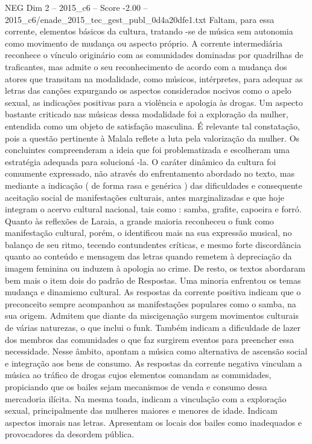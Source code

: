 \begin{textsample}{NEG Dim 2 – 2015\_c6 – Score -2.00 – 2015\_c6/enade\_2015\_tec\_gest\_publ\_0d4a20dfe1.txt}
Faltam, para essa corrente, elementos básicos da cultura, tratando -se de música sem autonomia como movimento de mudança ou aspecto próprio.
A corrente intermediária reconhece o vínculo originário com as comunidades dominadas por quadrilhas de traficantes, mas admite o seu reconhecimento de acordo com a mudança dos atores que transitam na modalidade, como músicos, intérpretes, para adequar as letras das canções expurgando os aspectos considerados nocivos como o apelo sexual, as indicações positivas para a violência e apologia às drogas.
Um aspecto bastante criticado nas músicas dessa modalidade foi a exploração da mulher, entendida como um objeto de satisfação masculina.
É relevante tal constatação, pois a questão pertinente à Malala reflete a luta pela valorização da mulher.
Os concluintes compreenderam a ideia que foi problematizada e escolheram uma estratégia adequada para solucioná -la.
O caráter dinâmico da cultura foi comumente expressado, não através do enfrentamento abordado no texto, mas mediante a indicação ( de forma rasa e genérica ) das dificuldades e consequente aceitação social de manifestações culturais, antes marginalizadas e que hoje integram o acervo cultural nacional, tais como : samba, grafite, capoeira e forró.
Quanto às reflexões de Laraia, a grande maioria reconheceu o funk como manifestação cultural, porém, o identificou mais na sua expressão musical, no balanço de seu ritmo, tecendo contundentes críticas, e mesmo forte discordância quanto ao conteúdo e mensagem das letras quando remetem à depreciação da imagem feminina ou induzem à apologia ao crime.
De resto, os textos abordaram bem mais o item dois do padrão de Respostas.
Uma minoria enfrentou os temas mudança e dinamismo cultural.
As respostas da corrente positiva indicam que o preconceito sempre acompanhou as manifestações populares como o samba, na sua origem.
Admitem que diante da miscigenação surgem movimentos culturais de várias naturezas, o que inclui o funk.
Também indicam a dificuldade de lazer dos membros das comunidades o que faz surgirem eventos para preencher essa necessidade.
Nesse âmbito, apontam a música como alternativa de ascensão social e integração aos bens de consumo.
As respostas da corrente negativa vinculam a música ao tráfico de drogas cujos elementos comandam as comunidades, propiciando que os bailes sejam mecanismos de venda e consumo dessa mercadoria ilícita.
Na mesma toada, indicam a vinculação com a exploração sexual, principalmente das mulheres maiores e menores de idade.
Indicam aspectos imorais nas letras.
Apresentam os locais dos bailes como inadequados e provocadores da desordem pública.

\end{textsample}

